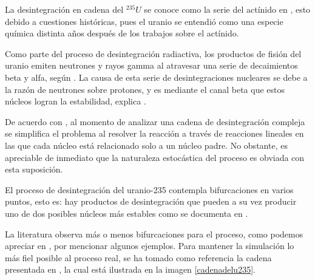 La desintegración en cadena  del $^{235} U$ se conoce como la serie del actínido en \cite{Podgorsak.2016}, esto debido a cuestiones históricas, pues el uranio se entendió como una especie química distinta años después de los trabajos sobre el actínido. 

Como parte del proceso de desintegración radiactiva, los productos de fisión del uranio emiten neutrones y rayos gamma al atravesar una serie de decaimientos beta y alfa, según \cite{Guo.2016}. La causa de esta serie de desintegraciones nucleares se debe a la razón de neutrones sobre protones, y es mediante el canal beta que estos núcleos logran la estabilidad, explica \cite{Guo.2016}. 

De acuerdo con \cite{Guo.2016}, al momento de analizar una cadena de desintegración compleja se simplifica el problema al resolver la reacción a través de reacciones lineales en las que cada núcleo está relacionado solo a un núcleo padre. No obstante, es apreciable de inmediato que la naturaleza estocástica del proceso es obviada con esta suposición.

El proceso de desintegración del uranio-235 contempla bifurcaciones en varios puntos, esto es: hay productos de desintegración que pueden a su vez producir uno de dos posibles núcleos más estables como se documenta en \cite{HUBENER2003211, International_Atomic_Energy_Agency2013-bq}. 

La literatura observa más o menos bifurcaciones para el proceso, como podemos apreciar en \cite{HUBENER2003211,International_Atomic_Energy_Agency2013-bq,Pratiwi.2021,Loch.2013}, por mencionar algunos ejemplos. Para mantener la simulación lo más fiel posible al proceso real, se ha tomado como referencia la cadena presentada en \cite{HUBENER2003211}, la cual está ilustrada en la imagen \ref{cadenadelu235}.

